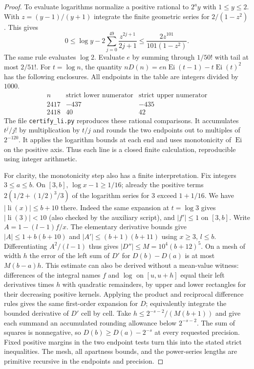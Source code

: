 \begin{proof}
To evaluate logarithms normalize a positive rational to $2^a y$ with $1\le y\le2$. With $z=(y-1)/(y+1)$ integrate the finite geometric series for $2/(1-z^2)$. This gives
\[
 0\le \log y-2\sum_{j=0}^{49}\frac{z^{2j+1}}{2j+1}
 \le \frac{2z^{101}}{101(1-z^2)}.
\]
The same rule evaluates $\log 2$. Evaluate $e$ by summing through $1/50!$ with tail at most $2/51!$. For $t=\log n$, the quantity $nD(n)=en\operatorname{Ei}(t-1)-t\operatorname{Ei}(t)^2$ has the following enclosures. All endpoints in the table are integers divided by $1000$.
\[
\begin{array}{c|rr}
 n & \text{strict lower numerator}& \text{strict upper numerator}\\\hline
 2417 & -437 &-435\\
 2418 & 40 &42
\end{array}
\]
The file \texttt{certify\_li.py} reproduces these rational comparisons. It accumulates $t^j/j!$ by multiplication by $t/j$ and rounds the two endpoints out to multiples of $2^{-120}$. It applies the logarithm bounds at each end and uses monotonicity of $\operatorname{Ei}$ on the positive axis. Thus each line is a closed finite calculation, reproducible using integer arithmetic.

For clarity, the monotonicity step also has a finite interpretation. Fix integers $3\le a\le b$. On $[3,b]$, $\log x-1\ge1/16$; already the positive terms $2(1/2+(1/2)^3/3)$ of the logarithm series for $3$ exceed $1+1/16$. We have $|\operatorname{li}(x)|\le b+10$ there. Indeed the same expansion at $t=\log3$ gives $|\operatorname{li}(3)|<10$ (also checked by the auxiliary script), and $|f'|\le1$ on $[3,b]$. Write $A=1-(l-1)f/x$. The elementary derivative bounds give $|A|\le 1+b(b+10)$ and $|A'|\le (b+1)(b+11)$ using $x\ge3$, $l\le b$. Differentiating $A^2/(l-1)$ thus gives $|D''|\le M=10^4(b+12)^5$. On a mesh of width $h$ the error of the left sum of $D'$ for $D(b)-D(a)$ is at most $M(b-a)h$. This estimate can also be derived without a mean-value witness: differences of the integral names $f$ and $\log$ on $[u,u+h]$ equal their left derivatives times $h$ with quadratic remainders, by upper and lower rectangles for their decreasing positive kernels. Applying the product and reciprocal difference rules gives the same first-order expansion for $D$; equivalently integrate the bounded derivative of $D'$ cell by cell. Take $h\le2^{-s-2}/(M(b+1))$ and give each summand an accumulated rounding allowance below $2^{-s-2}$. The sum of squares is nonnegative, so $D(b)\ge D(a)-2^{-s}$ at every requested precision. Fixed positive margins in the two endpoint tests turn this into the stated strict inequalities. The mesh, all apartness bounds, and the power-series lengths are primitive recursive in the endpoints and precision.
\end{proof}

